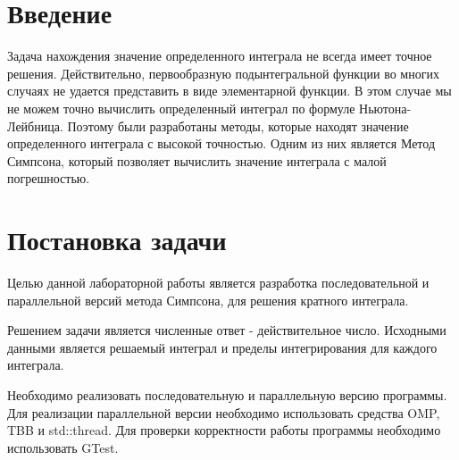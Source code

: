 \documentclass{report}
\begin{document}
\setcounter{page}{2}

\tableofcontents
\newpage

\section*{Введение}
Задача нахождения значение определенного интеграла не всегда имеет точное решения. Действительно, первообразную подынтегральной функции во многих случаях не удается представить в виде элементарной функции. В этом случае мы не можем точно вычислить определенный интеграл по формуле Ньютона-Лейбница.  Поэтому были разработаны методы, которые находят значение определенного интеграла с высокой точностью. Одним из них является Метод Симпсона, который позволяет вычислить значение интеграла с малой погрешностью.
\newpage

\section*{Постановка задачи}
Целью данной лабораторной работы является разработка последовательной и параллельной версий метода Симпсона, для решения кратного интеграла. 
\par Решением задачи является численные ответ - действительное число. Исходными данными является решаемый интеграл и пределы интегрирования для каждого интеграла.
\par Необходимо реализовать последовательную и параллельную версию программы. Для реализации параллельной версии необходимо использовать средства OMP, TBB и std::thread. Для проверки корректности работы программы необходимо использовать GTest.
\newpage

\end{document}
